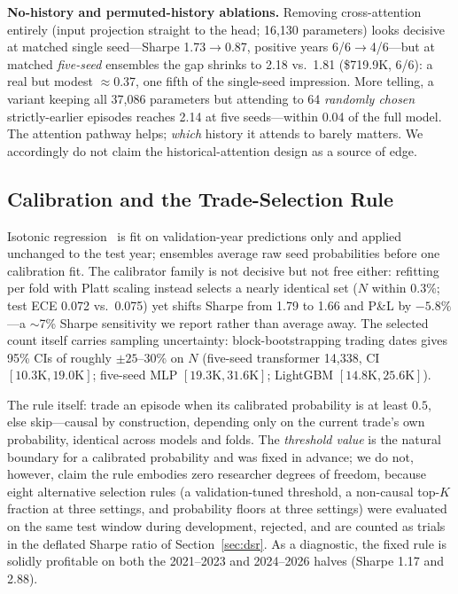 \documentclass[sigconf,review]{acmart}
\begin{document}
\noindent\textbf{No-history and permuted-history ablations.}
\label{sec:ablations}
Removing cross-attention entirely (input projection straight to the head; 16{,}130 parameters) looks decisive at matched single seed---Sharpe 1.73$\to$0.87, positive years 6/6$\to$4/6---but at matched \emph{five-seed} ensembles the gap shrinks to 2.18 vs.\ 1.81 (\$719.9K, 6/6): a real but modest $\approx$0.37, one fifth of the single-seed impression. More telling, a variant keeping all 37{,}086 parameters but attending to 64 \emph{randomly chosen} strictly-earlier episodes reaches 2.14 at five seeds---within 0.04 of the full model. The attention pathway helps; \emph{which} history it attends to barely matters. We accordingly do not claim the historical-attention design as a source of edge.

\subsection{Calibration and the Trade-Selection Rule}
\label{sec:calibration}
Isotonic regression~\cite{zadrozny2002transforming} is fit on validation-year predictions only and applied unchanged to the test year; ensembles average raw seed probabilities before one calibration fit. The calibrator family is not decisive but not free either: refitting per fold with Platt scaling instead selects a nearly identical set ($N$ within 0.3\%; test ECE 0.072 vs.\ 0.075) yet shifts Sharpe from 1.79 to 1.66 and P\&L by $-5.8\%$---a $\sim$7\% Sharpe sensitivity we report rather than average away.
The selected count itself carries sampling uncertainty: block-bootstrapping trading dates gives 95\% CIs of roughly $\pm25$--30\% on $N$ (five-seed transformer 14{,}338, CI $[10.3\text{K},19.0\text{K}]$; five-seed MLP $[19.3\text{K},31.6\text{K}]$; LightGBM $[14.8\text{K},25.6\text{K}]$).

The rule itself: trade an episode when its calibrated probability is at least $0.5$, else skip---causal by construction, depending only on the current trade's own probability, identical across models and folds. The \emph{threshold value} is the natural boundary for a calibrated probability and was fixed in advance; we do not, however, claim the rule embodies zero researcher degrees of freedom, because eight alternative selection rules (a validation-tuned threshold, a non-causal top-$K$ fraction at three settings, and probability floors at three settings) were evaluated on the same test window during development, rejected, and are counted as trials in the deflated Sharpe ratio of Section~\ref{sec:dsr}. As a diagnostic, the fixed rule is solidly profitable on both the 2021--2023 and 2024--2026 halves (Sharpe 1.17 and 2.88).
\end{document}
